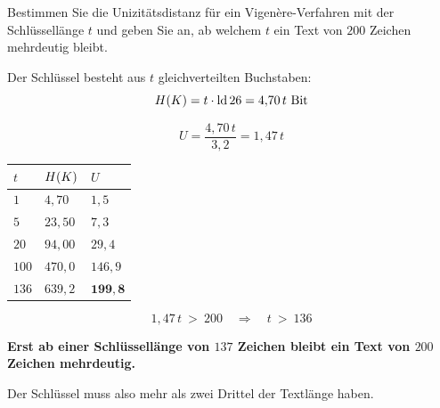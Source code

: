 \begin{aufgabe}
Bestimmen Sie die Unizitätsdistanz für ein Vigenère-Verfahren mit der Schlüssellänge $t$ und geben Sie an, ab welchem $t$ ein Text von $200$ Zeichen mehrdeutig bleibt.

\loesung
{}
Der Schlüssel besteht aus $t$ gleichverteilten Buchstaben:
\[ H(K) = t\cdot\operatorname{ld} 26 = 4{,}70\,t \ \text{Bit} \]

\[ U = \frac{4{,}70\,t}{3{,}2} = 1{,}47\,t \]

\begin{center}
{\small
\renewcommand{\arraystretch}{1.48}
\begin{tabular}{@{}P{1.6cm}P{2.2cm}P{2.4cm}@{}}
\toprule
$t$ & $H(K)$ & $U$\\
\midrule
$1$ & $4{,}70$ & $1{,}5$\\
$5$ & $23{,}50$ & $7{,}3$\\
$20$ & $94{,}00$ & $29{,}4$\\
$100$ & $470{,}0$ & $146{,}9$\\
$136$ & $639{,}2$ & $\mathbf{199{,}8}$\\
\bottomrule
\end{tabular}}
\end{center}

\[ 1{,}47\,t \ >\ 200 \quad\Longrightarrow\quad t \ >\ 136 \]

\begin{center}
\begin{minipage}{0.9\textwidth}
\textbf{Erst ab einer Schlüssellänge von $137$ Zeichen bleibt ein Text von $200$ Zeichen mehrdeutig.}
\end{minipage}
\end{center}

Der Schlüssel muss also mehr als zwei Drittel der Textlänge haben.

\begin{center}
\begin{minipage}{0.88\textwidth}
\end{minipage}
\end{center}


\end{aufgabe}
